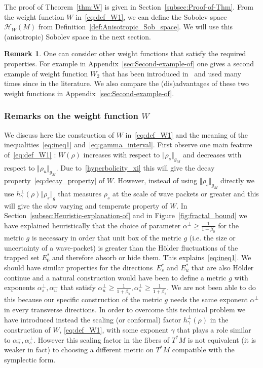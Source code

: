 \documentclass[10pt]{amsart}
\theoremstyle{definition}\newtheorem{defi}[theo]{Definition}\newtheorem{rema}[theo]{Remark}\newtheorem{exam}[theo]{Example}\newtheorem{exem}[theo]{Example}\newtheorem{nota}[theo]{Notation}
\newcommand{\clH}{\mathcal{H}}
\begin{document}
The proof of Theorem~\ref{thm:W} is given in Section~\ref{subsec:Proof-of-Thm}. From the weight function $W$ in~\eqref{eq:def_W1}, we can define the Sobolev space $\clH _{W}(M)$ from Definition~\ref{def:Anisotropic_Sob_space}. We will use this (anisotropic) Sobolev space in the next section.


\begin{rema}
One can consider other weight functions that satisfy the required properties. For example in Appendix~\ref{sec:Second-example-of} one gives a second example of weight function $W_{2}$ that has been introduced in~\cite{fred-roy-sjostrand-07,fred_flow_09} and used many times since in the literature. We also compare the (dis)advantages of these two weight functions in Appendix~\ref{sec:Second-example-of}.
\end{rema}


\subsubsection{Remarks on the weight function \texorpdfstring{$W$}{W}}\label{rem:Due-to-the}

We discuss here the construction of $W$ in~\eqref{eq:def_W1} and the meaning of the inequalities~\eqref{eq:ineq1} and~\eqref{eq:gamma_interval}. First observe one main feature of~\eqref{eq:def_W1} : $W(\rho)$ increases with respect to $\Vert \rho_{s}\Vert _{g_{M}}$ and decreases with respect to $\Vert \rho_{u}\Vert _{g_{M}}$. Due to~\eqref{hyperbolicity_xi} this will give the decay property~\eqref{eq:decay_property} of $W$. However, instead of using $\Vert \rho_{s}\Vert _{g_{M}}$ directly we use $h_{\gamma}^{\perp}(\rho)\Vert \rho_{s}\Vert _{g}$ that measures $\rho_{s}$ at the scale of wave packets or greater and this will give the slow varying and temperate property of $W$. In Section~\ref{subsec:Heuristic-explanation-of} and in Figure~\ref{fig:fractal_bound} we have explained heuristically that the choice of parameter $\alpha^{\perp}\geq\frac{1}{1+\beta_{0}}$ for the metric $g$ is necessary in order that unit box of the metric $g$ (i.e. the size or uncertainty of a wave-packet) is greater than the H\"older fluctuations of the trapped set $E_{0}^{*}$ and therefore absorb or hide them. This explains~\eqref{eq:ineq1}. We should have similar properties for the directions~$E_{s}^{*}$ and $E_{u}^{*}$ that are also H\"older continue and a natural construction would have been to define a metric $g$ with exponents $\alpha_{s}^{\perp},\alpha_{u}^{\perp}$ that satisfy $\alpha_{u}^{\perp}\geq\frac{1}{1+\beta_{u}},\alpha_{s}^{\perp}\geq\frac{1}{1+\beta_{s}}$. We are not been able to do this because our specific construction of the metric $g$ needs the same exponent $\alpha^{\perp}$ in every transverse directions. In order to overcome this technical problem we have introduced instead the scaling (or conformal) factor $h_{\gamma}^{\perp}(\rho)$ in the construction of $W$, \eqref{eq:def_W1}, with some exponent $\gamma$ that plays a role similar to $\alpha_{u}^{\perp},\alpha_{s}^{\perp}$. However this scaling factor in the fibers of $T^{*}M$ is not equivalent (it is weaker in fact) to choosing a different metric on $T^{*}M$ compatible with the symplectic form.
\end{document}
